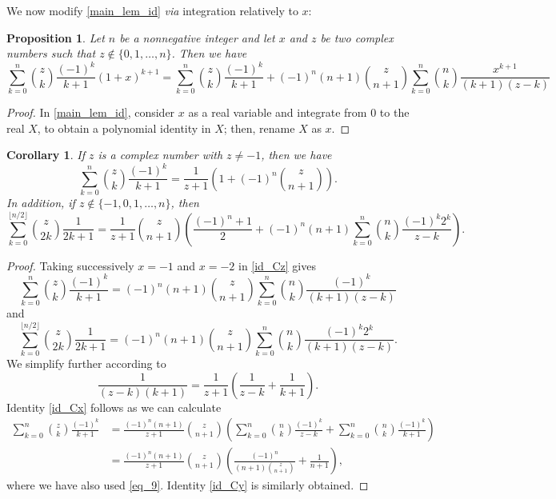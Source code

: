 \documentclass[10pt,a4paper]{amsart}
\numberwithin{equation}{section}
\newtheorem{proposition}[thm]{Proposition}
\newtheorem{corollary}[thm]{Corollary}
\begin{document}
We now modify \eqref{main_lem_id} \textit{via} integration relatively to $x$: 

\begin{proposition}
Let $n$ be a nonnegative integer and let $x$ and $z$ be two complex numbers such that $z\notin\{0,1,\ldots,n\}$. Then we have
\begin{equation}\label{id_Cz}
\sum_{k=0}^n\binom{z}{k}\frac{(-1)^k}{k+1}(1+x)^{k+1}=\sum_{k=0}^n\binom{z}{k}\frac{(-1)^k}{k+1}+(-1)^n(n+1)\binom{z}{n+1}\sum_{k=0}^n\binom{n}{k}\frac{x^{k+1}}{(k+1)(z-k)}
\end{equation}
\end{proposition}
\begin{proof}
In \eqref{main_lem_id}, consider $x$ as a real variable and integrate from $0$ to the  real $X$, to obtain a polynomial identity in $X$; then, rename $X$ as $x$. 
\end{proof}

\begin{corollary}
If $z$ is a complex number with $z\neq -1$, then we have
\begin{equation}\label{id_Cx}
\sum_{k=0}^n \binom{z}{k} \frac{(-1)^k}{k+1} = \frac{1}{z+1}\left (1+(-1)^n \binom{z}{n+1}\right ).
\end{equation}
In addition, if $z\notin\{-1,0,1,\ldots,n\}$, then 
\begin{equation}\label{id_Cy}
\sum_{k=0}^{\lfloor{n/2}\rfloor} \binom{z}{2k} \frac{1}{2k+1} = \frac{1}{z+1} \binom{z}{n+1} \left(\frac{(-1)^{n}+1}{2} + (-1)^n (n+1) 
\sum_{k=0}^n \binom{n}{k} \frac{(-1)^k 2^k}{z-k} \right ).
\end{equation}
\end{corollary}
\begin{proof}
Taking successively $x=-1$ and $x=-2$ in \eqref{id_Cz} gives 
\begin{equation*}
\sum_{k=0}^n\binom{z}{k}\frac{(-1)^k}{k+1} = (-1)^n(n+1)\binom{z}{n+1}\sum_{k=0}^n\binom{n}{k}\frac{(-1)^k}{(k+1)(z-k)}
\end{equation*}
and
\begin{equation*}
\sum_{k=0}^{\lfloor{n/2}\rfloor}\binom{z}{2k}\frac{1}{2k+1} = (-1)^n(n+1)\binom{z}{n+1}\sum_{k=0}^n\binom{n}{k}\frac{(-1)^k 2^k}{(k+1)(z-k)}.
\end{equation*}
We simplify further according to
$$\frac{1}{(z-k)(k+1)} = \frac{1}{z+1}\left (\frac{1}{z-k}+\frac{1}{k+1} \right ).$$
Identity \eqref{id_Cx} follows as we can calculate
\begin{align*}
\sum_{k=0}^n \binom{z}{k} \frac{(-1)^k}{k+1} &= \frac{(-1)^n (n+1)}{z+1}\binom{z}{n+1}\left ( \sum_{k=0}^n \binom{n}{k} \frac{(-1)^k}{z-k} + 
\sum_{k=0}^n \binom{n}{k} \frac{(-1)^k}{k+1} \right ) \\
&= \frac{(-1)^n (n+1)}{z+1}\binom{z}{n+1}\left ( \frac{(-1)^n}{(n+1)\binom{z}{n+1}} + \frac{1}{n+1} \right ),
\end{align*}
where we have also used \eqref{eq_9}. Identity \eqref{id_Cy} is similarly obtained. 
\end{proof}
\end{document}

